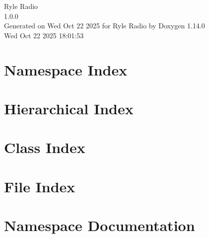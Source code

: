 \documentclass[twoside]{book}
\newcommand{\+}{\discretionary{\mbox{\scriptsize$\hookleftarrow$}}{}{}}
\newcommand{\clearemptydoublepage}{%
    \newpage{\pagestyle{empty}\cleardoublepage}%
  }
\begin{document}
  \raggedbottom
    \hypersetup{pageanchor=false,
                bookmarksnumbered=true,
                pdfencoding=unicode
               }
  \begin{titlepage}
  \vspace*{7cm}
  \begin{center}%
  {\Large Ryle Radio}\\
  [1ex]\large 1.\+0.\+0 \\
  \vspace*{1cm}
  {\large Generated on Wed Oct 22 2025 for Ryle Radio by Doxygen 1.14.0}\\
    \vspace*{0.5cm}
    {\small Wed Oct 22 2025 18:01:53}
  \end{center}
  \end{titlepage}
  \clearemptydoublepage
  \tableofcontents
  \clearemptydoublepage
  \hypersetup{pageanchor=true}
\chapter{Namespace Index}

\chapter{Hierarchical Index}

\chapter{Class Index}

\chapter{File Index}

\chapter{Namespace Documentation}





\end{document}
